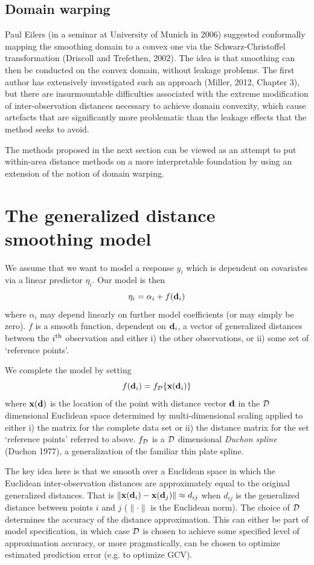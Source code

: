 \documentclass[useAMS, referee]{biom}
\begin{document}
\subsection*{Domain warping}


Paul Eilers (in a seminar at University of Munich in 2006) suggested conformally mapping the smoothing domain to a convex one  via the Schwarz-Christoffel transformation (Driscoll and Trefethen, 2002). The idea is that smoothing can then be conducted on the convex domain, without leakage problems. The first author has extensively investigated such an approach (Miller, 2012, Chapter 3), but there are insurmountable difficulties associated with the extreme modification of inter-observation distances necessary to achieve domain convexity, which cause artefacts that are significantly more problematic than the leakage effects that the method seeks to avoid. 

The methods proposed in the next section can be viewed as an attempt to put within-area distance methods on a more interpretable foundation by using an extension of the notion of domain warping. 


\section{The generalized distance smoothing model}
\label{proposed-model}

We assume that we want to model a response $y_i$ which is dependent on covariates via a linear predictor $\eta_i$. Our model is then
$$
\eta_i = \alpha_i + f({\bf d}_i)
$$
where $\alpha_i$ may depend linearly on further model coefficients (or may simply be zero). $f$ is a smooth function, dependent on ${\bf d}_i$, a vector of generalized distances between the $i^{\rm th}$ observation and either i) the other observations, or ii) some set of `reference points'. 

We complete the model by setting 
$$
f({\bf d}_i) = f_{\cal D}\{{\bf x}({\bf d}_i)\}
$$
where ${\bf x}({\bf d})$ is the location of the point with distance vector $\bf d$ in the $\cal D$ dimensional 
Euclidean space determined by multi-dimensional scaling applied to either i) the matrix for the complete data set or ii) the distance matrix for the set `reference points' referred to above. $f_{\cal D}$ is a $\cal D$ dimensional \textit{Duchon spline} (Duchon 1977), a generalization of the familiar thin plate spline. 

The key idea here is that we smooth over a Euclidean space  in which the Euclidean inter-observation distances are approximately equal to the original generalized distances. That is  $\|{\bf x}({\bf d}_i) - {\bf x}({\bf d}_j) \| \approx d_{ij}$ when $d_{ij}$ is the generalized distance between points $i$ and $j$ ($\|\cdot \|$ is the Euclidean norm). The choice of $\cal D$ determines the accuracy of the distance approximation. This can either be part of model specification, in which case $\cal D$ is chosen to achieve some specified level of approximation accuracy, or more pragmatically, can be chosen to optimize estimated prediction error (e.g. to optimize GCV).
\end{document}
